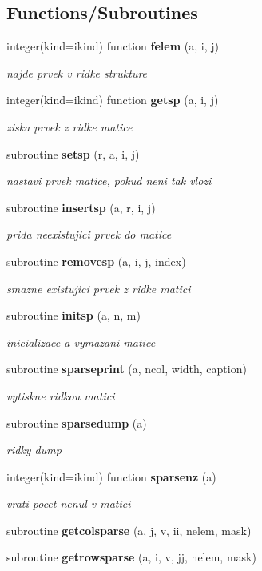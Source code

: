 \subsection*{Functions/\+Subroutines}
\begin{DoxyCompactItemize}
\item 
integer(kind=ikind) function {\bf felem} (a, i, j)
\begin{DoxyCompactList}\small\item\em najde prvek v ridke strukture \end{DoxyCompactList}\item 
integer(kind=ikind) function {\bf getsp} (a, i, j)
\begin{DoxyCompactList}\small\item\em ziska prvek z ridke matice \end{DoxyCompactList}\item 
subroutine {\bf setsp} (r, a, i, j)
\begin{DoxyCompactList}\small\item\em nastavi prvek matice, pokud neni tak vlozi \end{DoxyCompactList}\item 
subroutine {\bf insertsp} (a, r, i, j)
\begin{DoxyCompactList}\small\item\em prida neexistujici prvek do matice \end{DoxyCompactList}\item 
subroutine {\bf removesp} (a, i, j, index)
\begin{DoxyCompactList}\small\item\em smazne existujici prvek z ridke matici \end{DoxyCompactList}\item 
subroutine {\bf initsp} (a, n, m)
\begin{DoxyCompactList}\small\item\em inicializace a vymazani matice \end{DoxyCompactList}\item 
subroutine {\bf sparseprint} (a, ncol, width, caption)
\begin{DoxyCompactList}\small\item\em vytiskne ridkou matici \end{DoxyCompactList}\item 
subroutine {\bf sparsedump} (a)
\begin{DoxyCompactList}\small\item\em ridky dump \end{DoxyCompactList}\item 
integer(kind=ikind) function {\bf sparsenz} (a)
\begin{DoxyCompactList}\small\item\em vrati pocet nenul v matici \end{DoxyCompactList}\item 
subroutine {\bf getcolsparse} (a, j, v, ii, nelem, mask)
\item 
subroutine {\bf getrowsparse} (a, i, v, jj, nelem, mask)
\end{DoxyCompactItemize}


